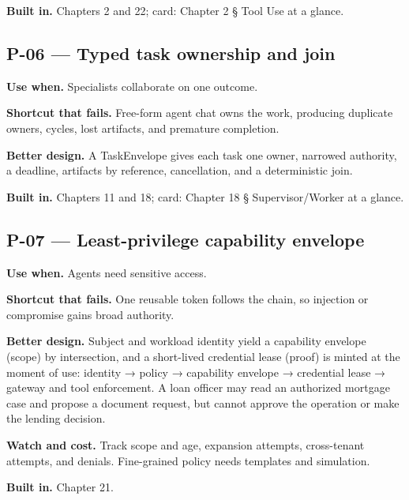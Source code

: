\textbf{Built in.} Chapters 2 and 22; card: Chapter 2 § Tool Use at a glance.\par

\subsection{P-06 — Typed task ownership and join}

\textbf{Use when.} Specialists collaborate on one outcome.\par

\textbf{Shortcut that fails.} Free-form agent chat owns the work, producing duplicate owners, cycles, lost artifacts, and premature completion.\par

\textbf{Better design.} A TaskEnvelope gives each task one owner, narrowed authority, a deadline, artifacts by reference, cancellation, and a deterministic join.\par

\textbf{Built in.} Chapters 11 and 18; card: Chapter 18 § Supervisor/Worker at a glance.\par

\subsection{P-07 — Least-privilege capability envelope}

\textbf{Use when.} Agents need sensitive access.\par

\textbf{Shortcut that fails.} One reusable token follows the chain, so injection or compromise gains broad authority.\par

\textbf{Better design.} Subject and workload identity yield a capability envelope (scope) by intersection, and a short-lived credential lease (proof) is minted at the moment of use: identity → policy → capability envelope → credential lease → gateway and tool enforcement. A loan officer may read an authorized mortgage case and propose a document request, but cannot approve the operation or make the lending decision.\par

\textbf{Watch and cost.} Track scope and age, expansion attempts, cross-tenant attempts, and denials. Fine-grained policy needs templates and simulation.\par

\textbf{Built in.} Chapter 21.\par


